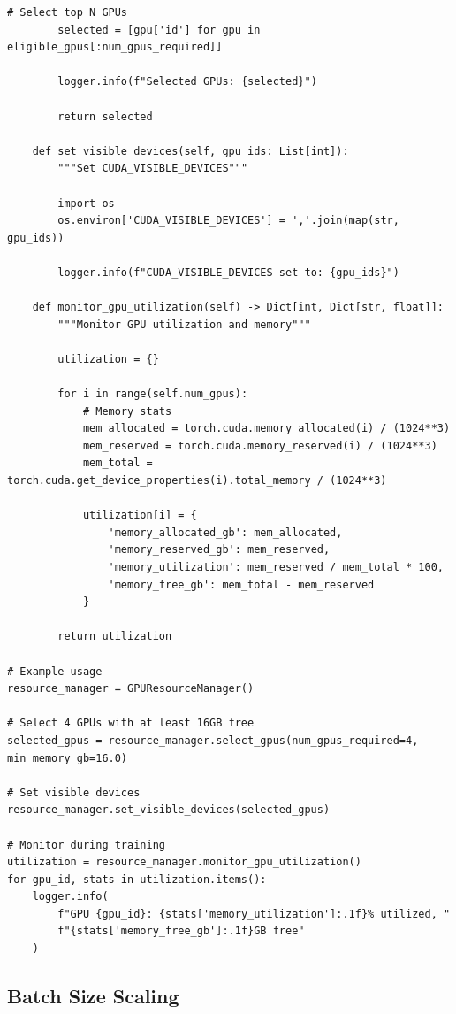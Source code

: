 \begin{lstlisting}[style=python, caption=Dynamic GPU Resource Allocation]
        # Select top N GPUs
        selected = [gpu['id'] for gpu in eligible_gpus[:num_gpus_required]]

        logger.info(f"Selected GPUs: {selected}")

        return selected

    def set_visible_devices(self, gpu_ids: List[int]):
        """Set CUDA_VISIBLE_DEVICES"""

        import os
        os.environ['CUDA_VISIBLE_DEVICES'] = ','.join(map(str, gpu_ids))

        logger.info(f"CUDA_VISIBLE_DEVICES set to: {gpu_ids}")

    def monitor_gpu_utilization(self) -> Dict[int, Dict[str, float]]:
        """Monitor GPU utilization and memory"""

        utilization = {}

        for i in range(self.num_gpus):
            # Memory stats
            mem_allocated = torch.cuda.memory_allocated(i) / (1024**3)
            mem_reserved = torch.cuda.memory_reserved(i) / (1024**3)
            mem_total = torch.cuda.get_device_properties(i).total_memory / (1024**3)

            utilization[i] = {
                'memory_allocated_gb': mem_allocated,
                'memory_reserved_gb': mem_reserved,
                'memory_utilization': mem_reserved / mem_total * 100,
                'memory_free_gb': mem_total - mem_reserved
            }

        return utilization

# Example usage
resource_manager = GPUResourceManager()

# Select 4 GPUs with at least 16GB free
selected_gpus = resource_manager.select_gpus(num_gpus_required=4, min_memory_gb=16.0)

# Set visible devices
resource_manager.set_visible_devices(selected_gpus)

# Monitor during training
utilization = resource_manager.monitor_gpu_utilization()
for gpu_id, stats in utilization.items():
    logger.info(
        f"GPU {gpu_id}: {stats['memory_utilization']:.1f}% utilized, "
        f"{stats['memory_free_gb']:.1f}GB free"
    )
\end{lstlisting}

\subsection{Batch Size Scaling}

